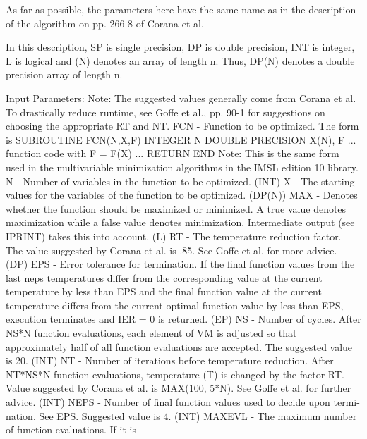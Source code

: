 \documentclass[11pt,twoside,nolof]{starlink}
\begin{document}
\begin{terminalv}
  As far as possible, the parameters here have the same name as in
  the description of the algorithm on pp. 266-8 of Corana et al.

  In this description, SP is single precision, DP is double precision,
  INT is integer, L is logical and (N) denotes an array of length n.
  Thus, DP(N) denotes a double precision array of length n.

  Input Parameters:
    Note: The suggested values generally come from Corana et al. To
          drastically reduce runtime, see Goffe et al., pp. 90-1 for
          suggestions on choosing the appropriate RT and NT.
    FCN - Function to be optimized. The form is
            SUBROUTINE FCN(N,X,F)
            INTEGER N
            DOUBLE PRECISION  X(N), F
            ...
            function code with F = F(X)
            ...
            RETURN
            END
          Note: This is the same form used in the multivariable
          minimization algorithms in the IMSL edition 10 library.
    N - Number of variables in the function to be optimized. (INT)
    X - The starting values for the variables of the function to be
        optimized. (DP(N))
    MAX - Denotes whether the function should be maximized or
          minimized. A true value denotes maximization while a false
          value denotes minimization. Intermediate output (see IPRINT)
          takes this into account. (L)
    RT - The temperature reduction factor. The value suggested by
         Corana et al. is .85. See Goffe et al. for more advice. (DP)
    EPS - Error tolerance for termination. If the final function
          values from the last neps temperatures differ from the
          corresponding value at the current temperature by less than
          EPS and the final function value at the current temperature
          differs from the current optimal function value by less than
          EPS, execution terminates and IER = 0 is returned. (EP)
    NS - Number of cycles. After NS*N function evaluations, each
         element of VM is adjusted so that approximately half of
         all function evaluations are accepted. The suggested value
         is 20. (INT)
    NT - Number of iterations before temperature reduction. After
         NT*NS*N function evaluations, temperature (T) is changed
         by the factor RT. Value suggested by Corana et al. is
         MAX(100, 5*N). See Goffe et al. for further advice. (INT)
    NEPS - Number of final function values used to decide upon termi-
           nation. See EPS. Suggested value is 4. (INT)
    MAXEVL - The maximum number of function evaluations. If it is

\end{terminalv}
\end{document}
